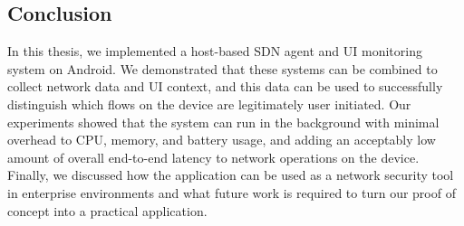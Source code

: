 \subsection{Conclusion}
\label{sec:conclusion}

In this thesis, we implemented a host-based SDN agent and UI monitoring system
on Android. We demonstrated that these systems can be combined to collect
network data and UI context, and this data can be used to successfully
distinguish which flows on the device are legitimately user initiated. Our
experiments showed that the system can run in the background with minimal
overhead to CPU, memory, and battery usage, and adding an acceptably low amount
of overall end-to-end latency to network operations on the device. Finally, we
discussed how the application can be used as a network security tool in
enterprise environments and what future work is required to turn our proof of
concept into a practical application.

\newpage

